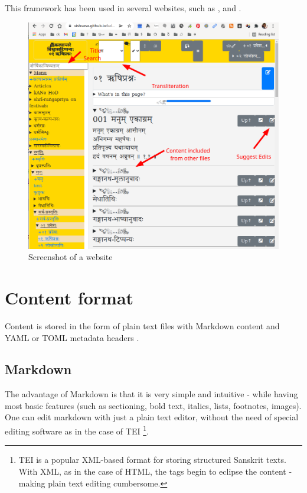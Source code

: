 \documentclass[11pt]{article}
\begin{document}
This framework has been used in several websites, such as \cite{vishvAsa_kalpAntaram}, \cite{vishvAsa_kannada} and \cite{vishvAsa_bhAShAntaram}.


\begin{figure}[h]
\caption{Screenshot of a website}
\centering
\includegraphics[width=1.0\textwidth]{images/kalpAntaram-screenshot}
\end{figure}


\section{Content format}
Content is stored in the form of plain text files with Markdown content \cite{commonmark} and YAML or TOML metadata headers \cite{toml}. 

\subsection{Markdown}
The advantage of Markdown is that it is very simple and intuitive - while having most basic features (such as sectioning, bold text, italics, lists, footnotes, images). One can edit markdown with just a plain text editor, without the need of special editing software as in the case of TEI \footnote{TEI is a popular XML-based format for storing structured Sanskrit texts. With XML, as in the case of HTML, the tags begin to eclipse the content - making plain text editing cumbersome.}. 
\end{document}
